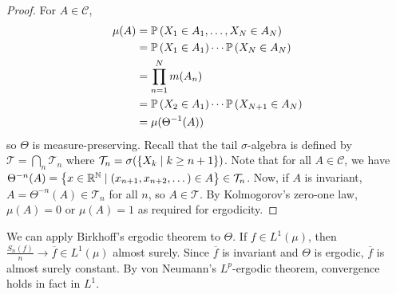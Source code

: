 \begin{proof}
	For \( A \in \mathcal C \),
	\begin{align*}
			\mu(A) &= \mathbb{P}\left({X_1 \in A_1, \dots, X_N \in A_N}\right) \\
			&= \mathbb{P}\left({X_1 \in A_1}\right) \cdots \mathbb{P}\left({X_N \in A_N}\right) \\
			&= \prod_{n=1}^N m(A_n) \\
			&= \mathbb{P}\left({X_2 \in A_1}\right) \cdots \mathbb{P}\left({X_{N+1} \in A_N}\right) \\
			&= \mu(\Theta^{-1}(A))
	\end{align*}
	so \( \Theta \) is measure-preserving.
	Recall that the tail \( \sigma \)-algebra is defined by \( \mathcal T = \bigcap_n \mathcal T_n \) where \( \mathcal T_n = \sigma(\qty{X_k \mid k \geq n + 1}) \).
	Note that for all \( A \in \mathcal C \), we have \( \Theta^{-n}(A) = \qty{x \in \mathbb R^{\mathbb N} \mid (x_{n+1}, x_{n+2}, \dots) \in A} \in \mathcal T_n \).
	Now, if \( A \) is invariant, \( A = \Theta^{-n}(A) \in \mathcal T_n \) for all \( n \), so \( A \in \mathcal T \).
	By Kolmogorov's zero-one law, \( \mu(A) = 0 \) or \( \mu(A) = 1 \) as required for ergodicity.
\end{proof}
We can apply Birkhoff's ergodic theorem to \( \Theta \).
If \( f \in L^1(\mu) \), then \( \frac{S_n(f)}{n} \to \overline f \in L^1(\mu) \) almost surely.
Since \( \overline f \) is invariant and \( \Theta \) is ergodic, \( \overline f \) is almost surely constant.
By von Neumann's \( L^p \)-ergodic theorem, convergence holds in fact in \( L^1 \).

